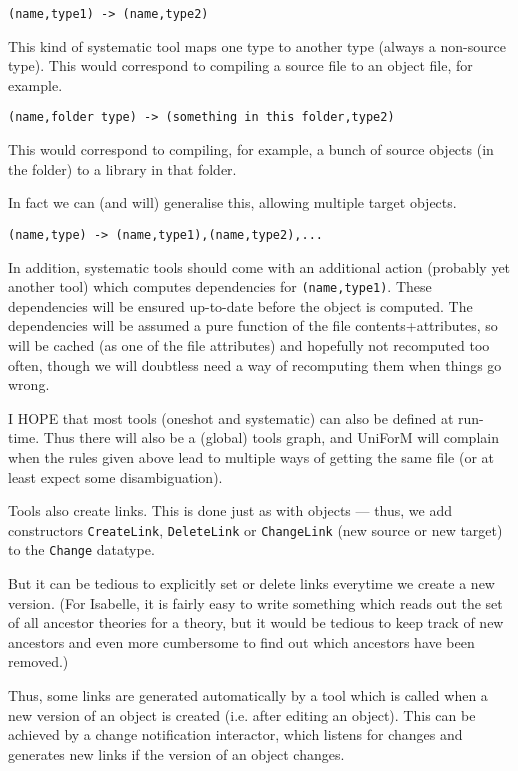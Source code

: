 \documentclass[a4paper]{article}
\begin{document}
\begin{verbatim}
(name,type1) -> (name,type2)
\end{verbatim}

This kind of systematic tool maps one type to another type (always
a non-source type).  This would
correspond to compiling a source file to an object file, for example.

\begin{verbatim}
(name,folder type) -> (something in this folder,type2)
\end{verbatim}

This would correspond to compiling, for example, a bunch of source objects
(in the folder) to a library in that folder.

In fact we can (and will) generalise this, allowing multiple target objects.
\begin{verbatim}
(name,type) -> (name,type1),(name,type2),...
\end{verbatim}

In addition, systematic tools should come with an additional action
(probably yet another tool) which computes dependencies for
\texttt{(name,type1)}.  These dependencies will be ensured up-to-date
before the object is computed.  The dependencies will be assumed a
pure function of the file contents+attributes, so will be cached (as
one of the file attributes) and hopefully not recomputed too often,
though we will doubtless need a way of recomputing them when things go
wrong.

I HOPE that most tools (oneshot and systematic) can also be defined at 
run-time.  Thus there will also be a (global) tools graph, and 
UniForM will complain when the rules given above lead to multiple ways of
getting the same file (or at least expect some disambiguation).

  Tools also create links. This is done just as with objects --- thus,
  we add constructors \texttt{CreateLink}, \texttt{DeleteLink} or
  \texttt{ChangeLink} (new source or new target) to the
  \texttt{Change} datatype. 

  But it can be tedious to explicitly set or delete links everytime we
  create a new version. (For Isabelle, it is fairly easy to write
  something which reads out the set of all ancestor theories for a 
  theory, but it would be tedious to keep track of new ancestors and
  even more cumbersome to find out which ancestors have been removed.)
 
  Thus, some links are generated automatically by a tool which is
  called when a new version of an object is created (i.e. after
  editing an object). This can be achieved by a change
  notification interactor, which listens for changes and generates new 
  links if the version of an object changes.
\end{document}
